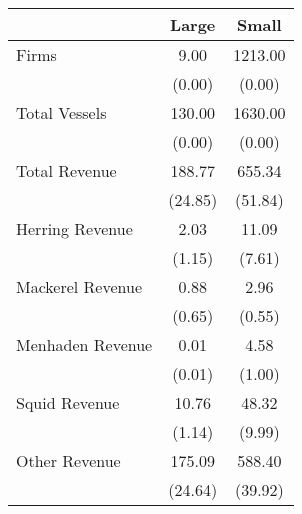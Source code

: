 \begin{tabular}{l*{2}{c}}
\hline\hline
                &    Large&    Small\\
\hline
Firms           &     9.00&  1213.00\\
                &   (0.00)&   (0.00)\\
Total Vessels   &   130.00&  1630.00\\
                &   (0.00)&   (0.00)\\
Total Revenue   &   188.77&   655.34\\
                &  (24.85)&  (51.84)\\
Herring Revenue &     2.03&    11.09\\
                &   (1.15)&   (7.61)\\
Mackerel Revenue&     0.88&     2.96\\
                &   (0.65)&   (0.55)\\
Menhaden Revenue&     0.01&     4.58\\
                &   (0.01)&   (1.00)\\
Squid Revenue   &    10.76&    48.32\\
                &   (1.14)&   (9.99)\\
Other Revenue   &   175.09&   588.40\\
                &  (24.64)&  (39.92)\\
\hline\hline
\end{tabular}
